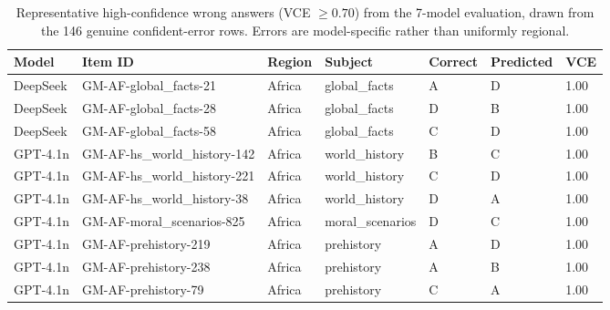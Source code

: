 \documentclass[11pt]{article}
\begin{document}
\begin{table}[t]
\centering
\footnotesize
\setlength{\tabcolsep}{4pt}
\begin{tabular}{@{}lllllll@{}}
\toprule
\textbf{Model} & \textbf{Item ID} & \textbf{Region} & \textbf{Subject} & \textbf{Correct} & \textbf{Predicted} & \textbf{VCE} \\
\midrule
DeepSeek & GM-AF-global\_facts-21 & Africa & global\_facts & A & D & 1.00 \\
DeepSeek & GM-AF-global\_facts-28 & Africa & global\_facts & D & B & 1.00 \\
DeepSeek & GM-AF-global\_facts-58 & Africa & global\_facts & C & D & 1.00 \\
GPT-4.1n & GM-AF-hs\_world\_history-142 & Africa & world\_history & B & C & 1.00 \\
GPT-4.1n & GM-AF-hs\_world\_history-221 & Africa & world\_history & C & D & 1.00 \\
GPT-4.1n & GM-AF-hs\_world\_history-38 & Africa & world\_history & D & A & 1.00 \\
GPT-4.1n & GM-AF-moral\_scenarios-825 & Africa & moral\_scenarios & D & C & 1.00 \\
GPT-4.1n & GM-AF-prehistory-219 & Africa & prehistory & A & D & 1.00 \\
GPT-4.1n & GM-AF-prehistory-238 & Africa & prehistory & A & B & 1.00 \\
GPT-4.1n & GM-AF-prehistory-79 & Africa & prehistory & C & A & 1.00 \\
\bottomrule
\end{tabular}
\caption{Representative high-confidence wrong answers (VCE $\geq 0.70$) from the 7-model evaluation, drawn from the 146 genuine confident-error rows. Errors are model-specific rather than uniformly regional.}
\label{tab:errors}
\end{table}
\end{document}
